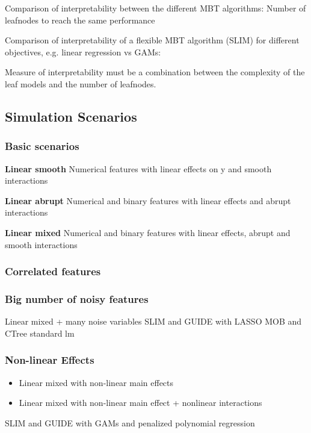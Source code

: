 Comparison of interpretability between the different MBT algorithms:
Number of leafnodes to reach the same performance

\vspace{0.5cm}

Comparison of interpretability of a flexible MBT algorithm (SLIM) for different objectives, e.g. linear regression vs GAMs:

Measure of interpretability must be a combination between the complexity of the leaf models and the number of leafnodes.

\subsection{Simulation Scenarios}

\subsubsection{Basic scenarios}
\textbf{Linear smooth}
Numerical features with linear effects on y and smooth interactions


\textbf{Linear abrupt}
Numerical and binary features with linear effects and abrupt interactions

\textbf{Linear mixed}
Numerical and binary features with linear effects, abrupt and smooth interactions

\subsubsection{Correlated features}

\subsubsection{Big number of noisy features}
Linear mixed + many noise variables
SLIM and GUIDE with LASSO
MOB and CTree standard lm

\subsubsection{Non-linear Effects}
\begin{itemize}
    \item Linear mixed with non-linear main effects
    \item Linear mixed with non-linear main effect + nonlinear interactions
\end{itemize}

SLIM and GUIDE with GAMs and penalized polynomial regression


